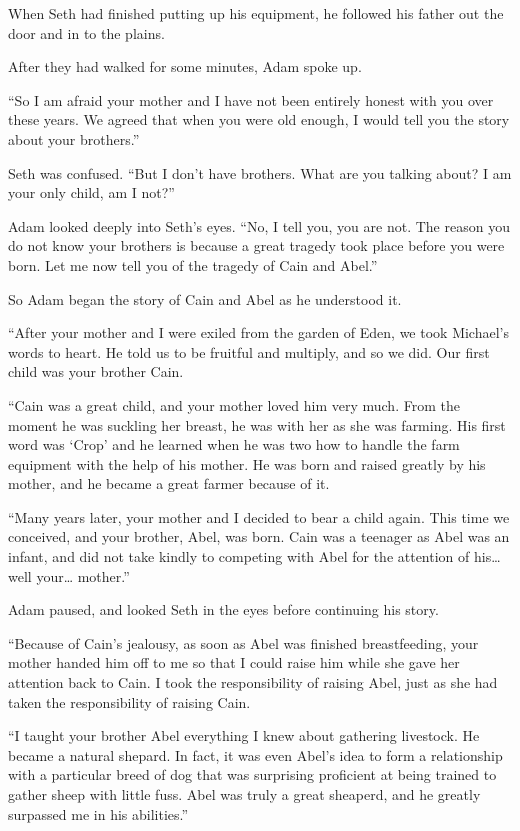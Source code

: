 \documentclass[12pt,twoside,titlepage]{report}
\begin{document}
When Seth had finished putting up his equipment, he followed his father
out the door and in to the plains.

After they had walked for some minutes, Adam spoke up.

``So I am afraid your mother and I have not been entirely honest with
you over these years. We agreed that when you were old enough, I would
tell you the story about your brothers.''

Seth was confused. ``But I don't have brothers. What are you talking
about? I am your only child, am I not?''

Adam looked deeply into Seth's eyes. ``No, I tell you, you are not. The
reason you do not know your brothers is because a great tragedy took
place before you were born. Let me now tell you of the tragedy of Cain
and Abel.''

So Adam began the story of Cain and Abel as he understood it.

``After your mother and I were exiled from the garden of Eden, we took
Michael's words to heart. He told us to be fruitful and multiply, and so
we did. Our first child was your brother Cain.

``Cain was a great child, and your mother loved him very much. From the
moment he was suckling her breast, he was with her as she was farming.
His first word was `Crop' and he learned when he was two how to handle
the farm equipment with the help of his mother. He was born and raised
greatly by his mother, and he became a great farmer because of it.

``Many years later, your mother and I decided to bear a child again.
This time we conceived, and your brother, Abel, was born. Cain was a
teenager as Abel was an infant, and did not take kindly to competing
with Abel for the attention of his\ldots{} well your\ldots{} mother.''

Adam paused, and looked Seth in the eyes before continuing his story.

``Because of Cain's jealousy, as soon as Abel was finished
breastfeeding, your mother handed him off to me so that I could raise
him while she gave her attention back to Cain. I took the responsibility
of raising Abel, just as she had taken the responsibility of raising
Cain.

``I taught your brother Abel everything I knew about gathering
livestock. He became a natural shepard. In fact, it was even Abel's idea
to form a relationship with a particular breed of dog that was
surprising proficient at being trained to gather sheep with little fuss.
Abel was truly a great sheaperd, and he greatly surpassed me in his
abilities.''
\end{document}
